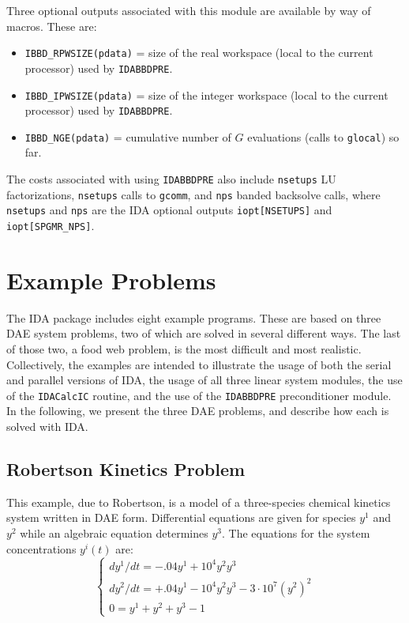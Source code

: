 Three optional outputs associated with this module are available by way of
macros. These are:

\begin{itemize}

\item  {\tt IBBD\_RPWSIZE(pdata)} = size of the real workspace (local to
the current processor) used by {\tt IDABBDPRE}.

\item  {\tt IBBD\_IPWSIZE(pdata)} = size of the integer workspace (local to
the current processor) used by {\tt IDABBDPRE}.

\item  {\tt IBBD\_NGE(pdata)} = cumulative number of $G$ evaluations (calls
to {\tt glocal}) so far.

\end{itemize}
The costs associated with using {\tt IDABBDPRE} also include {\tt nsetups}
LU factorizations, {\tt nsetups} calls to {\tt gcomm}, and {\tt nps}
banded backsolve calls, where {\tt nsetups} and {\tt nps} are the IDA
optional outputs {\tt iopt[NSETUPS]} and {\tt iopt[SPGMR\_NPS]}.


\section{Example Problems}

The IDA package includes eight example programs.  These are based on
three DAE system problems, two of which are solved in several
different ways.  The last of those two, a food web problem, is the most 
difficult and most realistic.  Collectively, the examples are intended 
to illustrate the usage of both the serial and parallel versions of IDA, 
the usage of all three linear system modules, the use of the {\tt IDACalcIC}
routine, and the use of the {\tt IDABBDPRE} preconditioner module.  In
the following, we present the three DAE problems, and describe how
each is solved with IDA.


\subsection{Robertson Kinetics Problem}

This example, due to Robertson, is a model of a three-species 
chemical kinetics system written in DAE form. Differential equations are given 
for species $y^1$ and $y^2$ while an algebraic equation determines $y^3$. The 
equations for the system concentrations $y^i(t)$ are:
\begin{equation}
\left\{ \begin{array}{l}
               dy^1/dt = -.04 y^1 + 10^4 y^2 y^3   \\
               dy^2/dt = +.04 y^1 - 10^4 y^2 y^3 - 3 \cdot 10^7 (y^2)^2  \\
               0 =  y^1 + y^2 + y^3 - 1
\end{array} \right.                                       \label{robsys}
\end{equation}

